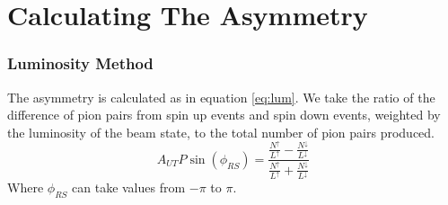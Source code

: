 \documentclass[abstract = on,listof=totoc, bibliography=totoc]{scrreprt}
\newcommand{\phir}{\phi_{R}}
\newcommand{\phis}{\phi_{S}}
\begin{document}
%
%

\FloatBarrier
\section{Calculating The Asymmetry}




\subsubsection{Luminosity Method}

The asymmetry is calculated as in equation \ref{eq:lum}. We take the ratio of the difference of pion pairs from spin up events and spin down events, weighted by the luminosity of the beam state, to the total number of pion pairs produced.
\begin{equation}
A_{UT}P\sin\left(\phi_{RS}\right) = \frac{\frac{N^\uparrow}{L^\uparrow} - \frac{N^\downarrow}{L^\downarrow}} {\frac{N^\uparrow}{L^\uparrow} + \frac{N^\downarrow}{L^\downarrow}}
\label{eq:lum}
\end{equation}
Where $\phi_{RS}$ can take values from $-\pi$ to $\pi$.
\end{document}
